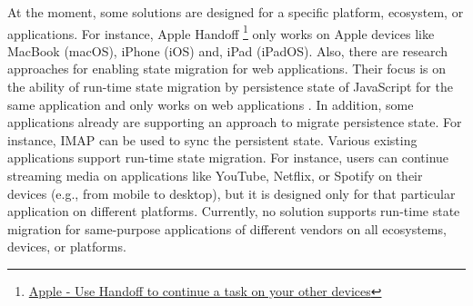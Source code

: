 At the moment, some solutions are designed for a specific platform, ecosystem, or applications.
For instance, Apple Handoff \footnote{\href{https://support.apple.com/en-us/HT209455}{Apple - Use Handoff to continue a task on your other devices}} only works on Apple devices like MacBook (macOS), iPhone (iOS) and, iPad (iPadOS).
Also, there are research approaches for enabling state migration for web applications.
Their focus is on the ability of run-time state migration by persistence state of JavaScript for the same application and only works on web applications  \cite{javascript-migration}. In addition, some applications already are supporting an approach to migrate persistence state. For instance, IMAP can be used to sync the persistent state.
Various existing applications support run-time state migration.
For instance, users can continue streaming media on applications like YouTube, Netflix, or Spotify on their devices (e.g., from mobile to desktop), but it is designed only for that particular application on different platforms.
Currently, no solution supports run-time state migration for same-purpose applications of different vendors on all ecosystems, devices, or platforms.
